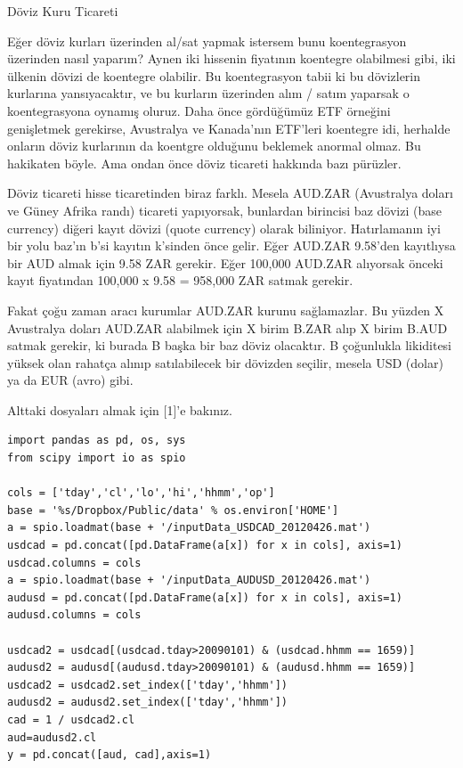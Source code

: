 \documentclass[12pt,fleqn]{article}\usepackage{../../common}
\begin{document}
Döviz Kuru Ticareti 

Eğer döviz kurları üzerinden al/sat yapmak istersem bunu koentegrasyon
üzerinden nasıl yaparım? Aynen iki hissenin fiyatının koentegre olabilmesi
gibi, iki ülkenin dövizi de koentegre olabilir. Bu koentegrasyon tabii ki
bu dövizlerin kurlarına yansıyacaktır, ve bu kurların üzerinden alım /
satım yaparsak o koentegrasyona oynamış oluruz. Daha önce gördüğümüz ETF
örneğini genişletmek gerekirse, Avustralya ve Kanada'nın ETF'leri koentegre
idi, herhalde onların döviz kurlarının da koentgre olduğunu beklemek
anormal olmaz. Bu hakikaten böyle. Ama ondan önce döviz ticareti hakkında
bazı pürüzler.

Döviz ticareti hisse ticaretinden biraz farklı. Mesela AUD.ZAR (Avustralya
doları ve Güney Afrika randı) ticareti yapıyorsak, bunlardan birincisi baz
dövizi (base currency) diğeri kayıt dövizi (quote currency) olarak
biliniyor. Hatırlamanın iyi bir yolu baz'ın b'si kayıtın k'sinden önce
gelir. Eğer AUD.ZAR 9.58'den kayıtlıysa bir AUD almak için 9.58 ZAR
gerekir. Eğer 100,000 AUD.ZAR alıyorsak önceki kayıt fiyatından 100,000 x
9.58 = 958,000 ZAR satmak gerekir.

Fakat çoğu zaman aracı kurumlar AUD.ZAR kurunu sağlamazlar. Bu yüzden X
Avustralya doları AUD.ZAR alabilmek için X birim B.ZAR alıp X birim B.AUD
satmak gerekir, ki burada B başka bir baz döviz olacaktır. B çoğunlukla
likiditesi yüksek olan rahatça alınıp satılabilecek bir dövizden seçilir,
mesela USD (dolar) ya da EUR (avro) gibi. 

Alttaki dosyaları almak için [1]'e bakınız. 

\begin{verbatim}
import pandas as pd, os, sys
from scipy import io as spio

cols = ['tday','cl','lo','hi','hhmm','op']
base = '%s/Dropbox/Public/data' % os.environ['HOME']
a = spio.loadmat(base + '/inputData_USDCAD_20120426.mat')
usdcad = pd.concat([pd.DataFrame(a[x]) for x in cols], axis=1)
usdcad.columns = cols
a = spio.loadmat(base + '/inputData_AUDUSD_20120426.mat')
audusd = pd.concat([pd.DataFrame(a[x]) for x in cols], axis=1)
audusd.columns = cols

usdcad2 = usdcad[(usdcad.tday>20090101) & (usdcad.hhmm == 1659)]
audusd2 = audusd[(audusd.tday>20090101) & (audusd.hhmm == 1659)]
usdcad2 = usdcad2.set_index(['tday','hhmm'])
audusd2 = audusd2.set_index(['tday','hhmm'])
cad = 1 / usdcad2.cl
aud=audusd2.cl
y = pd.concat([aud, cad],axis=1)
\end{verbatim}
\end{document}
